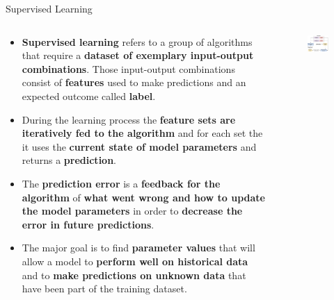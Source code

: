 \documentclass[document.tex]{subfiles}
\begin{document}
    \begin{frame}{Supervised Learning}
        \begin{columns}
            \begin{column}{.6\textwidth}
                \begin{itemize}
                    \item \textbf{Supervised learning} refers to a group of algorithms that require a \textbf{dataset of exemplary input-output combinations}. Those input-output combinations consist of \textbf{features} used to make predictions and an expected outcome called \textbf{label}.
                    \item During the learning process the \textbf{feature sets are iteratively fed to the algorithm} and for each set the it uses the \textbf{current state of model parameters} and returns a \textbf{prediction}.
                    \item The \textbf{prediction error} is a \textbf{feedback for the algorithm} of \textbf{what went wrong and how to update the model parameters} in order to \textbf{decrease the error in future predictions}. 
                    \item The major goal is to find \textbf{parameter values} that will allow a model to \textbf{perform well on historical data} and to \textbf{make predictions on unknown data} that have been part of the training dataset.
                \end{itemize}
            \end{column}
            \begin{column}{.4\textwidth}
                \begin{figure}
                    \label{fig:supervised-learning}
                    \includegraphics[width=\textwidth]{figures/drawio/supervised-learning.png}
                \end{figure}
            \end{column}
        \end{columns}
    \end{frame}
\end{document}
